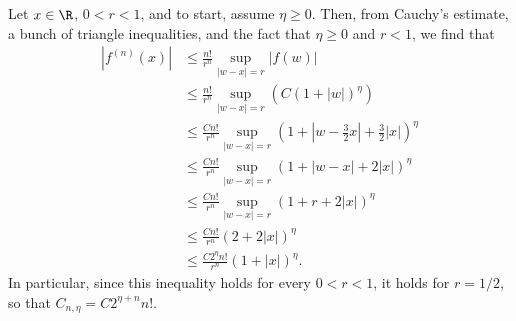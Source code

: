 \documentclass[10pt]{mypackage}
\begin{document}
\begin{solution}
  Let $x\in \R$, $0 < r < 1$, and to start, assume $\eta \geq 0$. Then, from Cauchy's estimate, a bunch of triangle inequalities, and the fact that $\eta \geq 0$ and $ r < 1 $, we find that
  \begin{align*}
    \left\vert f^{(n)}\left( x \right) \right\vert &\leq \frac{n!}{r^{n}} \sup_{\left\vert w-x \right\vert= r} \left\vert f(w) \right\vert\\
                                                   &\leq \frac{n!}{r^{n}} \sup_{\left\vert w-x \right\vert = r} \left( C\left( 1 + \left\vert w \right\vert \right)^{\eta} \right)\\
                                                   &\leq \frac{Cn!}{r^{n}} \sup_{\left\vert w-x \right\vert = r} \left( 1 + \left\vert w-\frac{3}{2} x\right\vert + \frac{3}{2}\left\vert x \right\vert \right)^{\eta}\\
                                                   &\leq \frac{Cn!}{r^{n}} \sup_{\left\vert w-x \right\vert = r} \left( 1 + \left\vert w-x \right\vert + 2\left\vert x \right\vert \right)^{\eta}\\
                                                   &\leq \frac{Cn!}{r^{n}}\sup_{\left\vert w-x \right\vert = r} \left( 1 + r + 2\left\vert x \right\vert \right)^{\eta}\\
                                                   &\leq \frac{Cn!}{r^{n}} \left( 2 + 2\left\vert x \right\vert \right)^{\eta}\\
                                                   &\leq \frac{C2^{\eta}n!}{r^{n}} \left( 1 + \left\vert x \right\vert \right)^{\eta}.
  \end{align*}
  In particular, since this inequality holds for every $0 < r < 1$, it holds for $r = 1/2$, so that $C_{n,\eta} = C2^{\eta + n}n!$.\newline


\end{solution}
\end{document}
